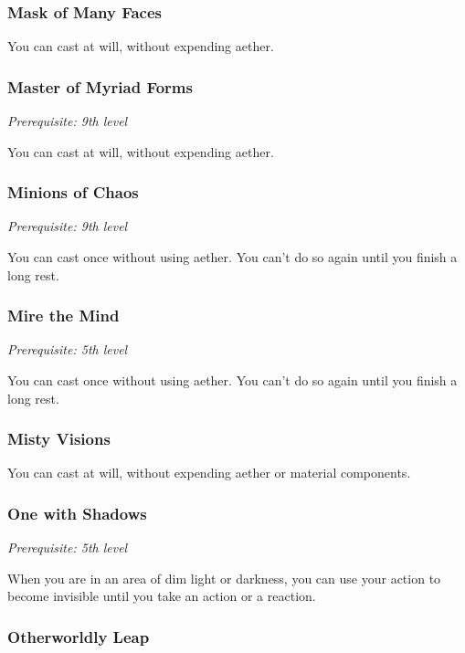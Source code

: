 \subsubsection{Mask of Many Faces}

You can cast  at will, without expending aether.

\subsubsection{Master of Myriad Forms}

\textit{Prerequisite: 9th level}

You can cast  at will, without expending aether.

\subsubsection{Minions of Chaos}

\textit{Prerequisite: 9th level}

You can cast  once without using aether. You can't do so again until you finish a long rest.

\subsubsection{Mire the Mind}

\textit{Prerequisite: 5th level}

You can cast  once without using aether. You can't do so again until you finish a long rest.

\subsubsection{Misty Visions}

You can cast  at will, without expending aether or material components.

\subsubsection{One with Shadows}

\textit{Prerequisite: 5th level}

When you are in an area of dim light or darkness, you can use your action to become invisible until you take an action or a reaction.

\subsubsection{Otherworldly Leap}

